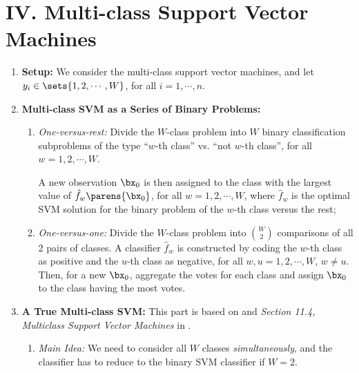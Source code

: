 \documentclass[12pt]{article}
\begin{document}
\section*{IV. Multi-class Support Vector Machines}

\begin{enumerate}[label=\textbf{\arabic*.}]

	\item \textbf{Setup:} We consider the multi-class support vector machines, and let $y_i \in \sets{1, 2, \cdots, W}$, for all $i = 1, \cdots, n$. 
	
	\item \textbf{Multi-class SVM as a Series of Binary Problems:} 
	\begin{enumerate}
		\item \textit{One-versus-rest:} Divide the $W$-class problem into $W$ binary classification subproblems of the type ``$w$-th class'' vs. ``not $w$-th class'', for all $w = 1, 2, \cdots, W$. 
		
		A new observation $\bx_0$ is then assigned to the class with the largest value of $\hat{f}_w \parens{\bx_0}$, for all $w = 1, 2, \cdots, W$, where $\hat{f}_w$ is the optimal SVM solution for the binary problem of the $w$-th class versus the rest; 
		
		\item \textit{One-versus-one:} Divide the $W$-class problem into ${W \choose 2}$ comparisons of all 2 pairs of classes. A classifier $\hat{f}_w$ is constructed by coding the $w$-th class as positive and the $u$-th class as negative, for all $w, u = 1, 2, \cdots, W$, $w \neq u$. Then, for a new $\bx_0$, aggregate the votes for each class and assign $\bx_0$ to the class having the most votes. 
	\end{enumerate}
	
	\item \textbf{A True Multi-class SVM:} This part is based on \textcite{Lee2012-lw} and \textit{Section 11.4, Multiclass Support Vector Machines} in \textcite{Izenman2009-jk}. 

	\begin{enumerate}
	
		\item \textit{Main Idea:} We need to consider all $W$ classes \emph{simultaneously}, and the classifier has to reduce to the binary SVM classifier if $W = 2$. 
		

\end{enumerate}
\end{enumerate}
\end{document}
